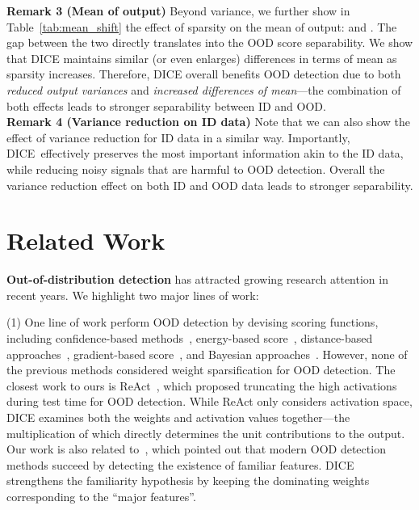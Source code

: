 \documentclass[runningheads]{llncs}
\newcommand{\methodAbbr}{DICE~}
\begin{document}
\noindent \textbf{Remark 3 (Mean of output)}  Beyond variance, we further show in Table~\ref{tab:mean_shift} the effect of sparsity on the mean of output:  and . The gap between the two directly translates into the OOD score separability. We show that DICE maintains similar (or even enlarges) differences in terms of mean as sparsity  increases. Therefore, DICE overall benefits OOD detection due to both \emph{reduced output variances} and \emph{increased differences of mean}---the combination of both effects leads to stronger separability between ID and OOD. \\

\noindent \textbf{Remark 4 (Variance reduction on ID data)}
Note that we can also show the effect of variance reduction for ID data in a similar way. 
Importantly, \methodAbbr effectively preserves the most important information akin to the ID data, while reducing noisy signals that are harmful to OOD detection. Overall the variance reduction effect on both ID and OOD data leads to stronger separability.






\section{Related Work}
\label{sec:related}
\noindent \textbf{Out-of-distribution detection}  
has attracted growing research attention in recent years. We highlight two major lines of work:

(1) One line of work perform OOD detection by devising scoring functions, including confidence-based methods~\cite{bendale2016towards,Kevin,huang2021mos,liang2018enhancing}, energy-based score~\cite{lin2021mood,liu2020energy,morteza2022provable,wang2021canmulti,sun2021react}, distance-based approaches~\cite{lee2018simple,2021ssd,sun2022knnood,tack2020csi}, gradient-based score~\cite{huang2021importance}, and Bayesian approaches~\cite{gal2016dropout,lakshminarayanan2017simple,maddox2019simple,malinin2018predictive,dpn19nips}. However, {none} of the previous methods considered weight sparsification for OOD detection. 
The closest work to ours is ReAct~\cite{sun2021react}, which proposed truncating the
high activations during test time for OOD detection. While ReAct only considers activation space, DICE examines both the weights and
activation values together---the multiplication of which directly determines the unit contributions to the output. Our work is also related to~\cite{dietterich2022familiarity}, which pointed out that modern OOD detection methods succeed by detecting the existence of familiar features. DICE strengthens the familiarity hypothesis by keeping the dominating weights corresponding to the ``major features''.  
\end{document}
